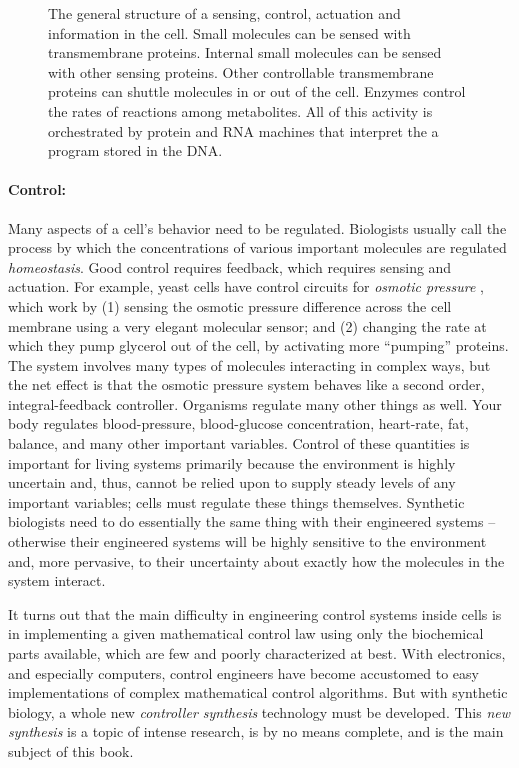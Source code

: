 \begin{figure}
\centering
{}
\caption{\label{fig:thecell} The general structure of a sensing,
  control, actuation and information in the cell. Small molecules can
  be sensed with transmembrane proteins. Internal small molecules can
  be sensed with other sensing proteins. Other controllable
  transmembrane proteins can shuttle molecules in or out of the
  cell. Enzymes control the rates of reactions among metabolites. All
  of this activity is orchestrated by protein and RNA machines that
  interpret the a program stored in the DNA.}
\end{figure}

\paragraph{Control:} Many aspects of a cell's behavior need to be
regulated. Biologists usually call the process by which the
concentrations of various important molecules are regulated {\em
  homeostasis}. Good control requires feedback, which requires sensing
and actuation. For example, yeast cells have control circuits for {\em
  osmotic pressure} \cite{avano-osmotic}, which work by (1) sensing
the osmotic pressure difference across the cell membrane using a very
elegant molecular sensor; and (2) changing the rate at which they pump
glycerol out of the cell, by activating more ``pumping'' proteins. The
system involves many types of molecules interacting in complex ways,
but the net effect is that the osmotic pressure system behaves like a
second order, integral-feedback controller.  Organisms regulate many
other things as well. Your body regulates blood-pressure,
blood-glucose concentration, heart-rate, fat, balance, and many other
important variables. Control of these quantities is important for living
systems primarily because the environment is highly uncertain and,
thus, cannot be relied upon to supply steady levels of any important
variables; cells must regulate these things themselves. Synthetic
biologists need to do essentially the same thing with their engineered
systems -- otherwise their engineered systems will be highly sensitive
to the environment and, more pervasive, to their uncertainty about
exactly how the molecules in the system interact.

It turns out that the main difficulty in engineering control systems
inside cells is in implementing a given mathematical control law using
only the biochemical parts available, which are few and poorly
characterized at best. With electronics, and especially computers,
control engineers have become accustomed to easy implementations of
complex mathematical control algorithms. But with synthetic biology, a
whole new {\em controller synthesis} technology must be developed. This
{\em new synthesis} is a topic of intense research, is by no means
complete, and is the main subject of this book.

